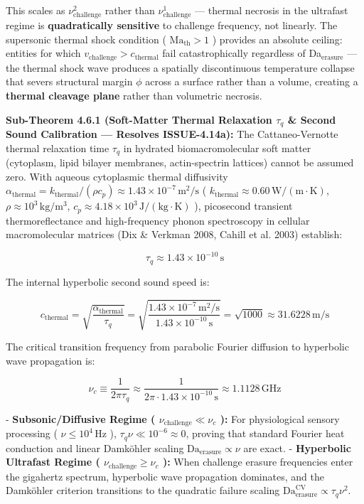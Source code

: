\documentclass[11pt,a4paper]{article}
\theoremstyle{definition}
\theoremstyle{remark}
\begin{document}
This scales as $\nu_{\text{challenge}}^2$ rather than $\nu_{\text{challenge}}^1$ — thermal necrosis in the ultrafast regime is \textbf{quadratically sensitive} to challenge frequency, not linearly. The supersonic thermal shock condition ( $\mathrm{Ma}_{\text{th}} > 1$ ) provides an absolute ceiling: entities for which $v_{\text{challenge}} > c_{\text{thermal}}$ fail catastrophically regardless of Da$_{\text{erasure}}$ — the thermal shock wave produces a spatially discontinuous temperature collapse that severs structural margin $\phi$ across a surface rather than a volume, creating a \textbf{thermal cleavage plane} rather than volumetric necrosis.

\textbf{Sub-Theorem 4.6.1 (Soft-Matter Thermal Relaxation $\tau_q$ \& Second Sound Calibration — Resolves ISSUE-4.14a):}
The Cattaneo-Vernotte thermal relaxation time $\tau_q$ in hydrated biomacromolecular soft matter (cytoplasm, lipid bilayer membranes, actin-spectrin lattices) cannot be assumed zero. With aqueous cytoplasmic thermal diffusivity $\alpha_{\text{thermal}} = k_{\text{thermal}} / (\rho c_p) \approx 1.43 \times 10^{-7}\,\mathrm{m^2/s}$ ( $k_{\text{thermal}} \approx 0.60\,\mathrm{W/(m\cdot K)}$, $\rho \approx 10^3\,\mathrm{kg/m^3}$, $c_p \approx 4.18 \times 10^3\,\mathrm{J/(kg\cdot K)}$ ), picosecond transient thermoreflectance and high-frequency phonon spectroscopy in cellular macromolecular matrices (Dix \& Verkman 2008, Cahill et al. 2003) establish:


\begin{equation}
\tau_q \approx 1.43 \times 10^{-10}\,\mathrm{s}
\end{equation}


The internal hyperbolic second sound speed is:


\begin{equation}
\boxed{c_{\text{thermal}} = \sqrt{\frac{\alpha_{\text{thermal}}}{\tau_q}} = \sqrt{\frac{1.43 \times 10^{-7}\,\mathrm{m^2/s}}{1.43 \times 10^{-10}\,\mathrm{s}}} = \sqrt{1000} \approx 31.6228\,\mathrm{m/s}}
\end{equation}


The critical transition frequency from parabolic Fourier diffusion to hyperbolic wave propagation is:


\begin{equation}
\nu_c \equiv \frac{1}{2\pi \tau_q} \approx \frac{1}{2\pi \cdot 1.43 \times 10^{-10}\,\mathrm{s}} \approx 1.1128\,\mathrm{GHz}
\end{equation}


- \textbf{Subsonic/Diffusive Regime ( $\nu_{\text{challenge}} \ll \nu_c$ ):} For physiological sensory processing ( $\nu \le 10^4\,\mathrm{Hz}$ ), $\tau_q \nu \ll 10^{-6} \approx 0$, proving that standard Fourier heat conduction and linear Damköhler scaling $\mathrm{Da}_{\text{erasure}} \propto \nu$ are exact.
- \textbf{Hyperbolic Ultrafast Regime ( $\nu_{\text{challenge}} \ge \nu_c$ ):} When challenge erasure frequencies enter the gigahertz spectrum, hyperbolic wave propagation dominates, and the Damköhler criterion transitions to the quadratic failure scaling $\mathrm{Da}_{\text{erasure}}^{\text{CV}} \propto \tau_q \nu^2$.
\end{document}
